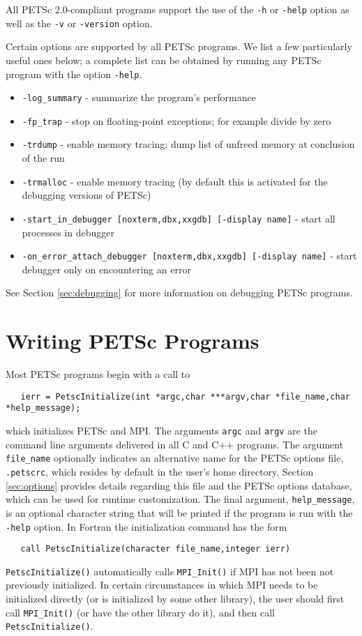 All PETSc 2.0-compliant programs support the use of the {\tt -h}
 or {\tt -help} option as well as the {\tt -v} 
or {\tt -version} option. 


Certain options are supported by all PETSc programs.  We list a few 
particularly useful ones below; a complete list can be obtained by 
running any PETSc program with the option {\tt -help}.
\begin{itemize}
\item {\tt -log\_summary} - summarize the program's performance
\item {\tt -fp\_trap} - stop on floating-point exceptions; 
      for example divide by zero
\item {\tt -trdump} - enable memory tracing; dump list of unfreed memory 
      at conclusion  of the run
\item {\tt -trmalloc} - enable memory tracing (by default this is 
      activated for the debugging versions of PETSc)
\item {\tt -start\_in\_debugger [noxterm,dbx,xxgdb] [-display name]} 
     - start all processes in debugger
\item {\tt -on\_error\_attach\_debugger [noxterm,dbx,xxgdb]
      [-display name]} - start debugger only on encountering an error
\end{itemize}
See Section \ref{sec:debugging} for more information on debugging PETSc programs.

\section{Writing PETSc Programs}
\label{sec:writing}

Most PETSc programs begin with a call to 
\begin{verbatim}
   ierr = PetscInitialize(int *argc,char ***argv,char *file_name,char *help_message);
\end{verbatim} 
which initializes PETSc and MPI.  The arguments {\tt argc} and 
{\tt argv} are the command line arguments delivered in all C and C++
programs.  The argument {\tt file\_name}
optionally indicates an alternative name for the PETSc options file,
{\tt .petscrc}, which resides by default in the user's home directory.
Section \ref{sec:options} provides details regarding
this file and the PETSc options database, which can be used for runtime
customization. The final argument, {\tt help\_message}, is an optional
character string that will be printed if the program is run with the
{\tt -help} option.  In Fortran the initialization command has the form
\begin{verbatim}
   call PetscInitialize(character file_name,integer ierr)
\end{verbatim} 
{\tt PetscInitialize()} automatically calls {\tt MPI\_Init()} if MPI
has not been not previously initialized. In certain 
circumstances in which MPI needs to be initialized directly (or is
initialized by some other library), the user should first call 
{\tt MPI\_Init()} (or have the other library do it), and then call
{\tt PetscInitialize()}.

